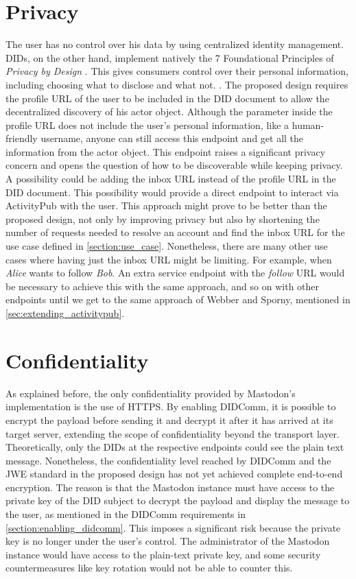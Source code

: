 \section{Privacy}
The user has no control over his data by using centralized identity management. DIDs, on the other hand,  implement natively the 7 Foundational Principles of \emph{Privacy by Design} \cite{cavoukian_2006}. This gives consumers control over their personal information, including choosing what to disclose and what not. \cite{sporny_longley_sabadello_reed_steele_2021}. The proposed design requires the profile URL of the user to be included in the DID document to allow the decentralized discovery of his actor object. Although the parameter inside the profile URL does not include the user's personal information, like a human-friendly username, anyone can still access this endpoint and get all the information from the actor object. This endpoint raises a significant privacy concern and opens the question of how to be discoverable while keeping privacy. A possibility could be adding the inbox URL instead of the profile URL in the DID document. This possibility would provide a direct endpoint to interact via ActivityPub with the user. This approach might prove to be better than the proposed design, not only by improving privacy but also by shortening the number of requests needed to resolve an account and find the inbox URL for the use case defined in \autoref{section:use_case}. Nonetheless, there are many other use cases where having just the inbox URL might be limiting. For example, when \emph{Alice} wants to follow \emph{Bob}. An extra service endpoint with the \emph{follow} URL would be necessary to achieve this with the same approach, and so on with other endpoints until we get to the same approach of Webber and Sporny, mentioned in \autoref{sec:extending_activitypub}. 


\section{Confidentiality}\label{sec:confidentiality}
As explained before, the only confidentiality provided by Mastodon's implementation is the use of HTTPS. By enabling DIDComm, it is possible to encrypt the payload before sending it and decrypt it after it has arrived at its target server, extending the scope of confidentiality beyond the transport layer. Theoretically, only the DIDs at the respective endpoints could see the plain text message. 
Nonetheless, the confidentiality level reached by DIDComm and the JWE standard in the proposed design has not yet achieved complete end-to-end encryption. The reason is that the Mastodon instance must have access to the private key of the DID subject to decrypt the payload and display the message to the user, as mentioned in the DIDComm requirements in \autoref{section:enabling_didcomm}. This imposes a significant risk because the private key is no longer under the user's control. The administrator of the Mastodon instance would have access to the plain-text private key, and some security countermeasures like key rotation would not be able to counter this.



